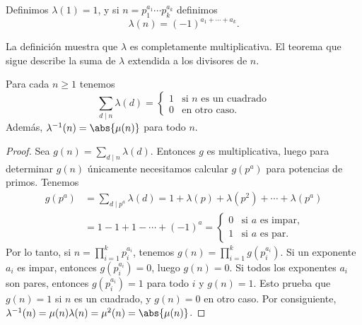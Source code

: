 \documentclass[12pt,a4paper]{book}
\begin{document}
    \begin{definicion}
        Definimos $\lambda(1)=1$, y si $n=p_{1}^{a_{1}}\cdots p_{k}^{a_{k}}$ definimos
        \begin{equation*}
            \lambda(n)=(-1)^{a_{1}+\cdots+a_{k}}.
        \end{equation*}
    \end{definicion}

    La definición muestra que $\lambda$ es completamente multiplicativa. El teorema que
    sigue describe la suma de $\lambda$ extendida a los divisores de $n$.

    \begin{teorema}
        Para cada $n\geq1$ tenemos
        \begin{equation*}
            \sum_{d\mid n}\lambda(d)=
            \begin{cases}
                1 & \text{si } n \text{ es un cuadrado}\\
                0 & \text{en otro caso.}
            \end{cases}
        \end{equation*}
        Además, $\lambda^{-1}(n)=\abs{\mu(n)}$ para todo $n$.
    \end{teorema}

    \begin{proof}
        Sea $g(n)=\sum_{d\mid n}\lambda(d)$. Entonces $g$ es multiplicativa, luego para
        determinar $g(n)$ únicamente necesitamos calcular $g(p^{a})$ para potencias de
        primos. Tenemos
        \begin{align*}
            g(p^{a})&=\sum_{d\mid p^{a}}\lambda(d)=1+\lambda(p)+\lambda(p^{2})+\cdots+\lambda(p^{a})\\
            &=1-1+1-\cdots+(-1)^{a}=
            \begin{cases}
                0 & \text{si } a \text{ es impar,}\\
                1 & \text{si } a \text{ es par.}
            \end{cases}
        \end{align*}
        Por lo tanto, si $n=\prod_{i=1}^{k}p_{i}^{a_{i}}$, tenemos
        $g(n)=\prod_{i=1}^{k}g(p_{i}^{a_{i}})$. Si un exponente $a_{i}$ es impar, entonces
        $g(p_{i}^{a_{i}})=0$, luego $g(n)=0$. Si todos los exponentes $a_{i}$ son pares, entonces
        $g(p_{i}^{a_{i}})=1$ para todo $i$ y $g(n)=1$. Esto prueba que $g(n)=1$ si $n$ es un
        cuadrado, y $g(n)=0$ en otro caso. Por consiguiente,
        $\lambda^{-1}(n)=\mu(n)\lambda(n)=\mu^{2}(n)=\abs{\mu(n)}$.
    \end{proof}
\end{document}
